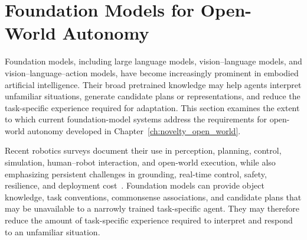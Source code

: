
\section{Foundation Models for Open-World Autonomy}
\label{sec:foundation_models}

Foundation models, including large language models, vision--language models, and vision--language--action models, have become increasingly prominent in embodied artificial intelligence.
Their broad pretrained knowledge may help agents interpret unfamiliar situations, generate candidate plans or representations, and reduce the task-specific experience required for adaptation.
This section examines the extent to which current foundation-model systems address the requirements for open-world autonomy developed in Chapter~\ref{ch:novelty_open_world}.


Recent robotics surveys document their use in perception, planning, control, simulation, human--robot interaction, and open-world execution, while also emphasizing persistent challenges in grounding, real-time control, safety, resilience, and deployment cost~\citep{khan2025foundation,sapkota2025vla}.
Foundation models can provide object knowledge, task conventions, commonsense associations, and candidate plans that may be unavailable to a narrowly trained task-specific agent.
They may therefore reduce the amount of task-specific experience required to interpret and respond to an unfamiliar situation.

